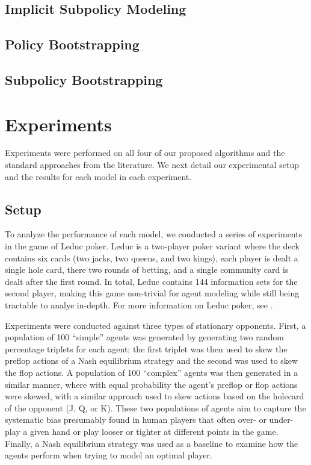 \documentclass{aamas2013}
\begin{document}
    \subsection{Implicit Subpolicy Modeling}

    \subsection{Policy Bootstrapping}

    \subsection{Subpolicy Bootstrapping}

\section{Experiments}
Experiments were performed on all four of our proposed algorithms and the standard approaches from the literature. We next detail our experimental setup and the results for each model in each experiment.

    \subsection{Setup}
    To analyze the performance of each model, we conducted a series of experiments in the game of Leduc poker. Leduc is a two-player poker variant where the deck contains six cards (two jacks, two queens, and two kings), each player is dealt a single hole card, there two rounds of betting, and a single community card is dealt after the first round. In total, Leduc contains 144 information sets for the second player, making this game non-trivial for agent modeling while still being tractable to analye in-depth. For more information on Leduc poker, see \cite{bayesbluff}.

    Experiments were conducted against three types of stationary opponents. First, a population of 100 ``simple'' agents was generated by generating two random percentage triplets for each agent; the first triplet was then used to skew the preflop actions of a Nash equilibrium strategy and the second was used to skew the flop actions. A population of 100 ``complex'' agents was then generated in a similar manner, where with equal probability the agent's preflop or flop actions were skewed, with a similar approach used to skew actions based on the holecard of the opponent (J, Q, or K). These two populations of agents aim to capture the systematic bias presumably found in human players that often over- or under- play a given hand or play looser or tighter at different points in the game. Finally, a Nash equilibrium strategy was used as a baseline to examine how the agents perform when trying to model an optimal player.
\end{document}
